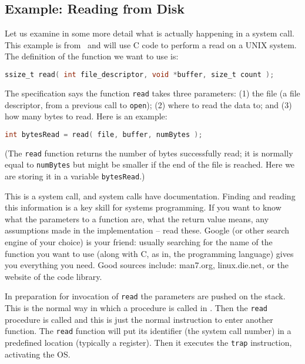 \subsection*{Example: Reading from Disk}
Let us examine in some more detail what is actually happening in a
system call. This example is from~\cite{mos} and will use C code to
perform a read on a UNIX system. The definition of the function we want to use is:

\begin{lstlisting}[language=C]
ssize_t read( int file_descriptor, void *buffer, size_t count );
\end{lstlisting}

The specification says the function
\texttt{read} takes three parameters: (1) the file (a file
descriptor, from a previous call to \texttt{open}); (2) where to read
the data to; and (3) how many bytes to read. Here is an example:

\begin{lstlisting}[language=C]
int bytesRead = read( file, buffer, numBytes );
\end{lstlisting}

(The \texttt{read} function returns the number of bytes successfully read; it is normally equal to \texttt{numBytes} but might be smaller if the end of the file is reached. Here we are storing it in a variable \texttt{bytesRead}.)

This is a system call, and system calls have documentation. Finding and reading this information is a key skill for systems programming. If you want to know what the parameters to a function are, what the return value means, any assumptions made in the implementation -- read these. Google (or other search engine of your choice) is your friend: usually searching for the name of the function you want to use (along with C, as in, the programming language) gives you everything you need.  Good sources include: man7.org, linux.die.net, or the website of the code library.



In preparation for invocation of \texttt{read} the parameters are pushed on the stack. This is the normal way in which a procedure is called in \Cpp. Then the \texttt{read} procedure is called and this is just the normal instruction to enter another function. The \texttt{read} function will put its identifier (the system call number) in a predefined location (typically a register). Then it executes the \texttt{trap} instruction, activating the OS.

